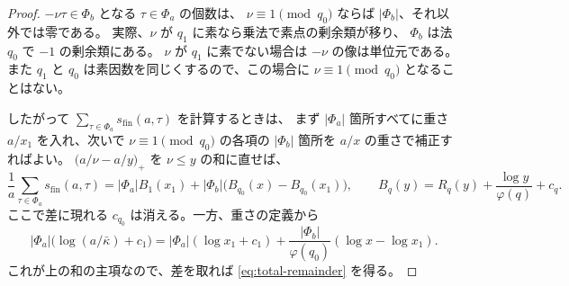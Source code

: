 \begin{proof}
\(-\nu\tau\in\Phi_b\) となる \(\tau\in\Phi_a\) の個数は、
\(\nu\equiv1\pmod{q_0}\) ならば \(|\Phi_b|\)、それ以外では零である。
実際、\(\nu\) が \(q_1\) に素なら乗法で素点の剰余類が移り、
\(\Phi_b\) は法 \(q_0\) で \(-1\) の剰余類にある。
\(\nu\) が \(q_1\) に素でない場合は \(-\nu\) の像は単位元である。
また \(q_1\) と \(q_0\) は素因数を同じくするので、この場合に
\(\nu\equiv1\pmod{q_0}\) となることはない。

したがって \(\sum_{\tau\in\Phi_a}s_{\mathrm{fin}}(a,\tau)\) を計算するときは、
まず \(|\Phi_a|\) 箇所すべてに重さ \(a/x_1\) を入れ、次いで
\(\nu\equiv1\pmod{q_0}\) の各項の \(|\Phi_b|\) 箇所を \(a/x\) の重さで補正すればよい。
\(\bigl(a/\nu-a/y\bigr)_+\) を \(\nu\le y\) の和に直せば、
\[
 \frac1a\sum_{\tau\in\Phi_a}s_{\mathrm{fin}}(a,\tau)
  =
 |\Phi_a|B_1(x_1)+|\Phi_b|\bigl(B_{q_0}(x)-B_{q_0}(x_1)\bigr),
 \qquad B_q(y)=R_q(y)+\frac{\log y}{\varphi(q)}+c_q .
\]
ここで差に現れる \(c_{q_0}\) は消える。一方、重さの定義から
\[
 |\Phi_a|\bigl(\log(a/\bar\kappa)+c_1\bigr)
 =|\Phi_a|(\log x_1+c_1)
   +\frac{|\Phi_b|}{\varphi(q_0)}(\log x-\log x_1).
\]
これが上の和の主項なので、差を取れば \eqref{eq:total-remainder} を得る。
\end{proof}
